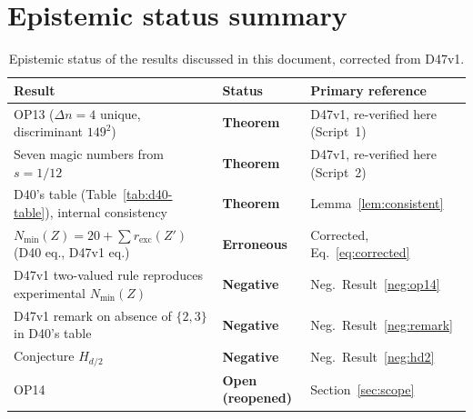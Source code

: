 \documentclass[12pt,a4paper]{article}
\theoremstyle{plain}
\theoremstyle{definition}
\theoremstyle{remark}
\newcommand{\Dn}{\Delta n}
\newcommand{\Nmin}{N_{\min}}
\newcommand{\rexc}{r_{\mathrm{exc}}}
\begin{document}
\section{Epistemic status summary}
\label{sec:epistemic}

\begin{table}[H]
\centering
\caption{Epistemic status of the results discussed in this document, corrected from D47v1.}
\label{tab:epistemic}
\medskip
\begin{tabular}{>{\raggedright}p{6.8cm} p{2.6cm} p{4.3cm}}
\toprule
Result & Status & Primary reference \\
\midrule
OP13 ($\Dn=4$ unique, discriminant $149^2$) & \textcolor{proofblue}{\textbf{Theorem}} & D47v1, re-verified here (Script~1) \\[2pt]
Seven magic numbers from $s=1/12$ & \textcolor{proofblue}{\textbf{Theorem}} & D47v1, re-verified here (Script~2) \\[2pt]
D40's table (Table~\ref{tab:d40-table}), internal consistency & \textcolor{proofblue}{\textbf{Theorem}} & Lemma~\ref{lem:consistent} \\[2pt]
$\Nmin(Z)=20+\sum\rexc(Z')$ (D40 eq., D47v1 eq.) & \textcolor{negativered}{\textbf{Erroneous}} & Corrected, Eq.~\eqref{eq:corrected} \\[2pt]
D47v1 two-valued rule reproduces experimental $\Nmin(Z)$ & \textcolor{negativered}{\textbf{Negative}} & Neg.\ Result~\ref{neg:op14} \\[2pt]
D47v1 remark on absence of $\{2,3\}$ in D40's table & \textcolor{negativered}{\textbf{Negative}} & Neg.\ Result~\ref{neg:remark} \\[2pt]
Conjecture $H_{d/2}$ & \textcolor{negativered}{\textbf{Negative}} & Neg.\ Result~\ref{neg:hd2} \\[2pt]
OP14 & \textcolor{openproblemred}{\textbf{Open (reopened)}} & Section~\ref{sec:scope} \\[2pt]
\bottomrule
\end{tabular}
\end{table}

\appendix
\end{document}
